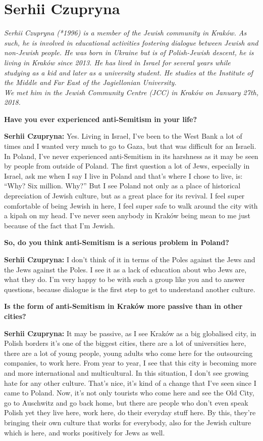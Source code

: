 \section{Serhii Czupryna}

\textit{Serhii Czupryna (*1996) is a member of the Jewish community in Kraków. As such, he is involved in educational activities fostering dialogue between Jewish and non-Jewish people. He was born in Ukraine but is of Polish-Jewish descent, he is living in Kraków since 2013. He has lived in Israel for several years while studying as a kid and later as a university student. He studies at the Institute of the Middle and Far East of the Jagiellonian University. \\
We met him in the Jewish Community Centre (JCC) in Kraków on January 27th, 2018.}\par
\vspace*{2em}
\textbf{Have you ever experienced anti-Semitism in your life?}\par
\textbf{Serhii Czupryna:} Yes. Living in Israel, I’ve been to the West Bank a lot of times and I wanted very much to go to Gaza, but that was difficult for an Israeli. In Poland, I’ve never experienced anti-Semitism in its harshness as it may be seen by people from outside of Poland. The first question a lot of Jews, especially in Israel, ask me when I say I live in Poland and that’s where I chose to live, is: “Why? Six million. Why?'' But I see Poland not only as a place of historical depreciation of Jewish culture, but as a great place for its revival. I feel super comfortable of being Jewish in here, I feel super safe to walk around the city with a kipah on my head. I’ve never seen anybody in Kraków being mean to me just because of the fact that I’m Jewish. \par
\textbf{So, do you think anti-Semitism is a serious problem in Poland?}\par 
\textbf{Serhii Czupryna:} I don’t think of it in terms of the Poles against the Jews and the Jews against the Poles. I see it as a lack of education about who Jews are, what they do. I’m very happy to be with such a group like you and to answer questions, because dialogue is the first step to get to understand another culture. \par
\textbf{Is the form of anti-Semitism in Kraków more passive than in other cities?}\par
\textbf{Serhii Czupryna:} It may be passive, as I see Kraków as a big globalised city, in Polish borders it’s one of the biggest cities, there are a lot of universities here, there are a lot of young people, young adults who come here for the outsourcing companies, to work here. From year to year, I see that this city is becoming more and more international and multicultural. In this situation, I don’t see growing hate for any other culture. That’s nice, it's kind of a change that I’ve seen since I came to Poland. Now, it’s not only tourists who come here and see the Old City, go to Auschwitz and go back home, but there are people who don’t even speak Polish yet they live here, work here, do their everyday stuff here. By this, they’re bringing their own culture that works for everybody, also for the Jewish culture which is here, and works positively for Jews as well.\par 
